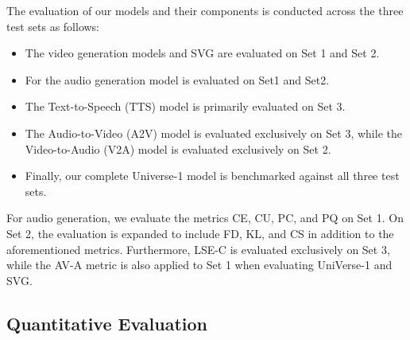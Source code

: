 The evaluation of our models and their components is conducted across the three test sets as follows:
\begin{itemize}[leftmargin=*]
    \item The video generation models and SVG are evaluated on Set 1 and Set 2.
    \item For the audio generation model is evaluated on Set1 and Set2.
    \item The Text-to-Speech (TTS) model is primarily evaluated on Set 3.
    \item The Audio-to-Video (A2V) model is evaluated exclusively on Set 3, while the Video-to-Audio (V2A) model is evaluated exclusively on Set 2.
    \item Finally, our complete Universe-1 model is benchmarked against all three test sets.
\end{itemize}
For audio generation, we evaluate the metrics CE, CU, PC, and PQ on Set 1. On Set 2, the evaluation is expanded to include FD, KL, and CS in addition to the aforementioned metrics. Furthermore, LSE-C is evaluated exclusively on Set 3, while the AV-A metric is also applied to Set 1 when evaluating UniVerse-1 and SVG.

\subsection{Quantitative Evaluation}

